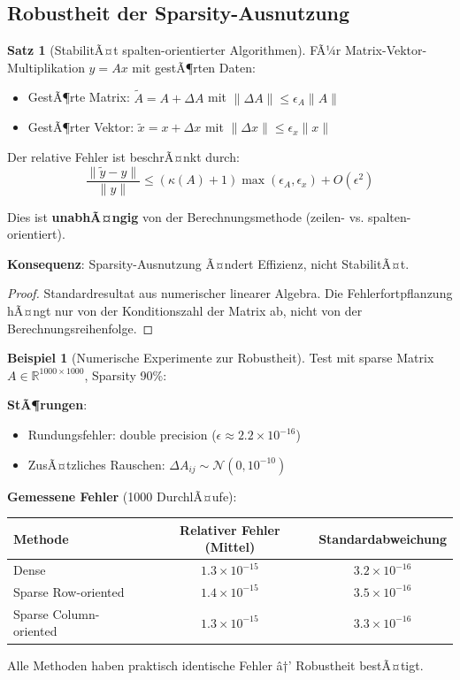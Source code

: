 ﻿\documentclass[a4paper,12pt]{report}
\theoremstyle{definition}
\newtheorem{beispiel}{Beispiel}
\newtheorem{satz}{Satz}
\begin{document}
	\subsection{Robustheit der Sparsity-Ausnutzung}
	
	\begin{satz}[StabilitÃ¤t spalten-orientierter Algorithmen]
		FÃ¼r Matrix-Vektor-Multiplikation $y = Ax$ mit gestÃ¶rten Daten:
		\begin{itemize}
			\item GestÃ¶rte Matrix: $\tilde{A} = A + \Delta A$ mit $\|\Delta A\| \leq \epsilon_A \|A\|$
			\item GestÃ¶rter Vektor: $\tilde{x} = x + \Delta x$ mit $\|\Delta x\| \leq \epsilon_x \|x\|$
		\end{itemize}
		
		Der relative Fehler ist beschrÃ¤nkt durch:
		\[
		\frac{\|\tilde{y} - y\|}{\|y\|} \leq \left( \kappa(A) + 1 \right) \max(\epsilon_A, \epsilon_x) + O(\epsilon^2)
		\]
		
		Dies ist \textbf{unabhÃ¤ngig} von der Berechnungsmethode (zeilen- vs. spalten-orientiert).
		
		\textbf{Konsequenz}: Sparsity-Ausnutzung Ã¤ndert Effizienz, nicht StabilitÃ¤t.
	\end{satz}
	
	\begin{proof}
		Standardresultat aus numerischer linearer Algebra. Die Fehlerfortpflanzung hÃ¤ngt nur von der Konditionszahl der Matrix ab, nicht von der Berechnungsreihenfolge.
	\end{proof}
	
	\begin{beispiel}[Numerische Experimente zur Robustheit]
		Test mit sparse Matrix $A \in \mathbb{R}^{1000 \times 1000}$, Sparsity 90\%:
		
		\textbf{StÃ¶rungen}:
		\begin{itemize}
			\item Rundungsfehler: double precision ($\epsilon \approx 2.2 \times 10^{-16}$)
			\item ZusÃ¤tzliches Rauschen: $\Delta A_{ij} \sim \mathcal{N}(0, 10^{-10})$
		\end{itemize}
		
		\textbf{Gemessene Fehler} (1000 DurchlÃ¤ufe):
		\begin{center}
			\begin{tabular}{|l|c|c|}
				\hline
				\textbf{Methode} & \textbf{Relativer Fehler (Mittel)} & \textbf{Standardabweichung} \\
				\hline
				Dense & $1.3 \times 10^{-15}$ & $3.2 \times 10^{-16}$ \\
				Sparse Row-oriented & $1.4 \times 10^{-15}$ & $3.5 \times 10^{-16}$ \\
				Sparse Column-oriented & $1.3 \times 10^{-15}$ & $3.3 \times 10^{-16}$ \\
				\hline
			\end{tabular}
		\end{center}
		
		Alle Methoden haben praktisch identische Fehler â†’ Robustheit bestÃ¤tigt.
	\end{beispiel}
	
\end{document}
